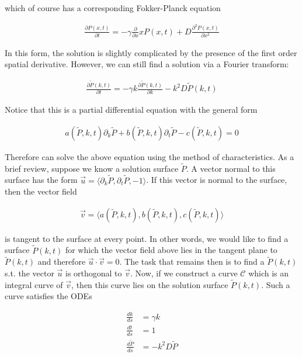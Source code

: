\documentclass{article}
\begin{document}
which of course has a corresponding Fokker-Planck equation

\begin{align}
\frac{\partial P(x,t)}{\partial t} = -\gamma\frac{\partial}{\partial x} x P(x,t) + D\frac{\partial^{2}P(x,t)}{\partial x^{2}}
\end{align}

In this form, the solution is slightly complicated by the presence of the first order spatial derivative. However, we can still find a solution via a Fourier transform:

\begin{align}
\frac{\partial \tilde{P}(k,t)}{\partial t}  =  -\gamma k \frac{\partial \tilde{P}(k,t)}{\partial k} -k^{2}D \tilde{P}(k,t)
\end{align}

Notice that this is a partial differential equation with the general form 

\begin{align}
a(\tilde{P},k,t)\partial_{k}\tilde{P} + b(\tilde{P},k,t)\partial_{t}\tilde{P} - c(\tilde{P},k,t) = 0
\end{align}

Therefore can solve the above equation using the method of characteristics. As a brief review, suppose we know a solution surface $\tilde{P}$. A vector normal to this surface has the form $\vec{u} = \langle \partial_{k}\tilde{P}, \partial_{t}\tilde{P}, -1 \rangle$. If this vector is normal to the surface, then the vector field 

\begin{align}
\vec{v} = \langle a(\tilde{P},k,t),b(\tilde{P},k,t),c(\tilde{P},k,t) \rangle
\end{align}

is tangent to the surface at every point. In other words, we would like to find a surface $\tilde{P}(k,t)$ for which the vector field above lies in the tangent plane to $\tilde{P}(k,t)$ and therefore $\vec{u}\cdot \vec{v} = 0$. The task that remains then is to find a $\tilde{P}(k,t)$ s.t. the vector $\vec{u}$ is orthogonal to $\vec{v}$. Now, if we construct a curve $\mathcal{C}$ which is an integral curve of $\vec{v}$, then this curve lies on the solution surface $\tilde{P}(k,t)$. Such a curve satisfies the ODEs

\begin{align*}
\frac{dk}{ds} &= \gamma k\\
\frac{dt}{ds} &= 1\\
\frac{d\tilde{P}}{ds} &= -k^{2}D\tilde{P}
\end{align*}
\end{document}
